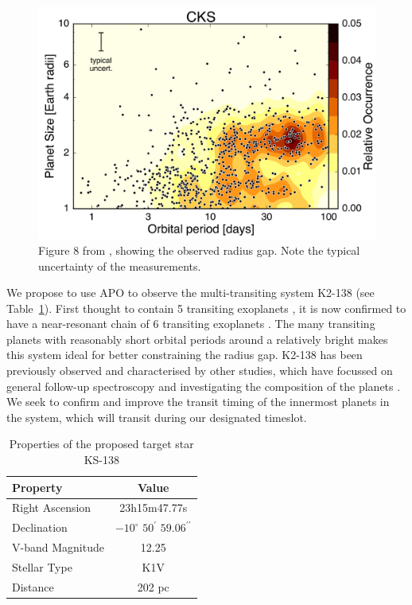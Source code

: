 \documentclass[twocolumn]{aastex631}
\begin{document}
\begin{figure}
    \centering
    \includegraphics[width=\columnwidth]{fulton_2017_fig8.png}
    \caption{Figure 8 from \citep{Fulton+2017}, showing the observed radius gap. Note the typical uncertainty of the measurements.}
    \label{fig:fulton_radius_gap}
\end{figure}

We propose to use APO to observe the multi-transiting system K2-138 (see Table~\ref{tab:star}). First thought to contain 5 transiting exoplanets \citep{Christiansen+2018}, it is now confirmed to have a near-resonant chain of 6 transiting exoplanets \citep{Hardegree-Ullman+2021}. The many transiting planets with reasonably short orbital periods around a relatively bright makes this system ideal for better constraining the radius gap. K2-138 has been previously observed and characterised by other studies, which have focussed on general follow-up spectroscopy \citep{Lopez+2019} and investigating the composition of the planets \citep{Acuna+2022}. We seek to confirm and improve the transit timing of the innermost planets in the system, which will transit during our designated timeslot.

\begin{table}[htb]
    \centering
    \begin{tabular}{l|c} 
        \hline
        Property & Value \\
        \hline\hline
        Right Ascension & 23h15m47.77s \\
        Declination & $-10^\circ$ $50^\prime$ $59.06^{\prime\prime}$ \\
        V-band Magnitude & 12.25 \\
        Stellar Type & K1V \\
        Distance & 202 pc \\
        \hline
    \end{tabular}
    \caption{Properties of the proposed target star KS-138}
    \label{tab:star}
\end{table}
\end{document}
